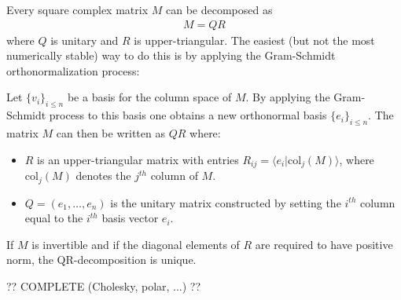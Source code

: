     \begin{method}[QR Decomposition]
        Every square complex matrix $M$ can be decomposed as
        \begin{gather}
            M = QR
        \end{gather}
        where $Q$ is unitary and $R$ is upper-triangular. The easiest (but not the most numerically stable) way to do this is by applying the Gram-Schmidt orthonormalization process:

        \qquad Let $\{v_i\}_{i\leq n}$ be a basis for the column space of $M$. By applying the Gram-Schmidt process to this basis one obtains a new orthonormal basis $\{e_i\}_{i\leq n}$. The matrix $M$ can then be written as $QR$ where:
        \begin{itemize}
            \item $R$ is an upper-triangular matrix with entries $R_{ij} = \langle e_i|\text{col}_j(M) \rangle$, where $\text{col}_j(M)$ denotes the $j^{th}$ column of $M$.
            \item $Q = (e_1,\ldots,e_n)$ is the unitary matrix constructed by setting the $i^{th}$ column equal to the $i^{th}$ basis vector $e_i$.
        \end{itemize}
    \end{method}
    \begin{property}
        If $M$ is invertible and if the diagonal elements of $R$ are required to have positive norm, the QR-decomposition is unique.
    \end{property}

    ?? COMPLETE (Cholesky, polar, ...) ??